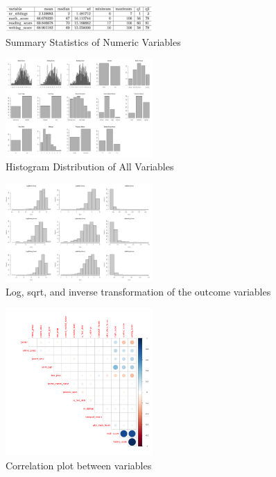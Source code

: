 \documentclass[
  12pt,
]{article}
\begin{document}
\begin{figure}
  \centering
  \includegraphics[width=0.5\textwidth]{table2.png}
  \caption{Summary Statistics of Numeric Variables}
\end{figure}

\begin{figure}
  \centering
  \includegraphics[width=0.5\textwidth]{normality_check.png}
  \caption{Histogram Distribution of All Variables}
\end{figure}

\begin{figure}
  \centering
  \includegraphics[width=0.5\textwidth]{transformation_check.png}
  \caption{Log, sqrt, and inverse transformation of the outcome variables}
\end{figure}

\begin{figure}
  \centering
  \includegraphics[width=0.5\textwidth]{correlation_plot.png}
  \caption{Correlation plot between variables}
\end{figure}
\end{document}
